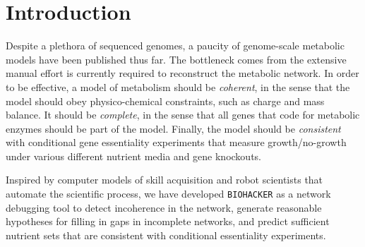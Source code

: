 \section{Introduction}
Despite a plethora of sequenced genomes, a paucity of genome-scale
metabolic models have been published thus far.  The bottleneck comes
from the extensive manual effort is currently required to reconstruct
the metabolic network.  In order to be effective, a model of
metabolism should be {\em coherent}, in the sense that the model
should obey physico-chemical constraints, such as charge and mass
balance.  It should be {\em complete}, in the sense that all genes
that code for metabolic enzymes should be part of the model.
Finally, the model should be {\em consistent} with conditional gene
essentiality experiments that measure growth/no-growth under various
different nutrient media and gene knockouts.

Inspired by computer models of skill acquisition\cite{HACKER} and
robot scientists that automate the scientific process\cite{king2004},
we have developed {\tt BIOHACKER} as a network debugging tool to
detect incoherence in the network, generate reasonable hypotheses for
filling in gaps in incomplete networks, and predict sufficient
nutrient sets that are consistent with conditional essentiality
experiments.


